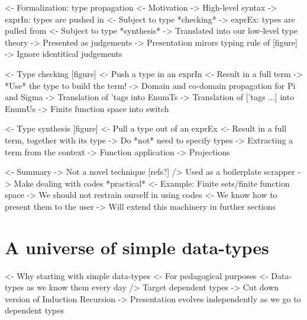 \documentclass{article}
\newenvironment{structure}{\footnotesize\verbatim}{\endverbatim}
\begin{document}
\begin{structure}
<- Formalization: type propagation
    <- Motivation
        -> High-level syntax
            -> exprIn: types are pushed in
                <- Subject to type *checking*
            -> exprEx: types are pulled from
                <- Subject to type *synthesis*
        -> Translated into our low-level type theory
        -> Presented as judgements
    -> Presentation mirors typing rule of [figure] 
        -> Ignore identitical judgements
\end{structure}

\begin{structure}
<- Type checking [figure]
    <- Push a type in an exprIn
    <- Result in a full term
    -> *Use* the type to build the term!
        -> Domain and co-domain propagation for Pi and Sigma
        -> Translation of 'tags into EnumTs
        -> Translation of ['tags ...] into EnumUs
        -> Finite function space into switch
\end{structure}

\begin{structure}
<- Type synthesis [figure]
    <- Pull a type out of an exprEx
    <- Result in a full term, together with its type
    -> Do *not* need to specify types
        -> Extracting a term from the context
        -> Function application
        -> Projections
\end{structure}

\begin{structure}
<- Summary
    -> Not a novel technique [refs?]
        /> Used as a boilerplate scrapper
    -> Make dealing with codes *practical*
        <- Example: Finite sets/finite function space
        -> We should not restrain ourself in using codes
            <- We know how to present them to the user
-> Will extend this machinery in further sections
\end{structure}

\section{A universe of simple data-types}

\begin{structure}
<- Why starting with simple data-types
    <- For pedagogical purposes
        <- Data-types as we know them every day
        /> Target dependent types
    -> Cut down version of Induction Recursion
        -> Presentation evolves independently as we go to dependent types
\end{structure}
\end{document}
